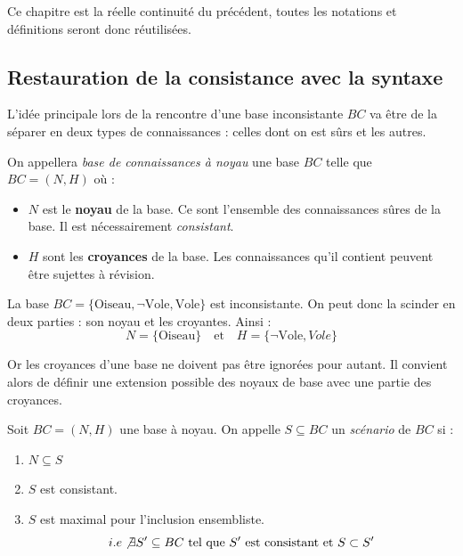 Ce chapitre est la réelle continuité du précédent, toutes les notations et définitions seront donc 
réutilisées. 

\subsection{Restauration de la consistance avec la syntaxe}

L'idée principale lors de la rencontre d'une base inconsistante $BC$ va être de la séparer 
en deux types de connaissances : celles dont on est sûrs et les autres. 

\begin{definition}
    On appellera \emph{base de connaissances à noyau} une base $BC$ telle que $ BC = (N, H)$ où :
    \begin{itemize}
        \item $N$ est le \textbf{noyau} de la base. Ce sont l'ensemble des connaissances 
        sûres de la base. Il est nécessairement \emph{consistant}. 
        \item $H$ sont les \textbf{croyances} de la base. Les connaissances qu'il contient 
        peuvent être sujettes à révision. 
    \end{itemize} 
\end{definition}

\begin{example}
    La base $BC = \{ \text{Oiseau}, \lnot \text{Vole}, \text{Vole}\}$ est inconsistante. 
    On peut donc la scinder en deux parties : son noyau et les croyantes. Ainsi : 
        $$ N = \{ \text{Oiseau} \} \quad \text{et} \quad H = \{ \lnot \text{Vole}, Vole \} $$
\end{example}

Or les croyances d'une base ne doivent pas être ignorées pour autant. 
Il convient alors de définir une extension possible des noyaux de base avec une partie
des croyances. 

\begin{definition}[Scenario]
    Soit $BC = (N, H)$ une base à noyau. On appelle $S \subseteq BC$ un \emph{scénario} de $BC$ si : 
    \begin{enumerate}[label=\roman*)]
        \item $ N \subseteq S$
        \item $S$ est consistant. 
        \item $S$ est maximal pour l'inclusion ensembliste. 
            $$ i.e \not \exists S' \subseteq BC \text{ tel que } S' \text{ est consistant et } S \subset S' $$ 
    \end{enumerate}
\end{definition}

